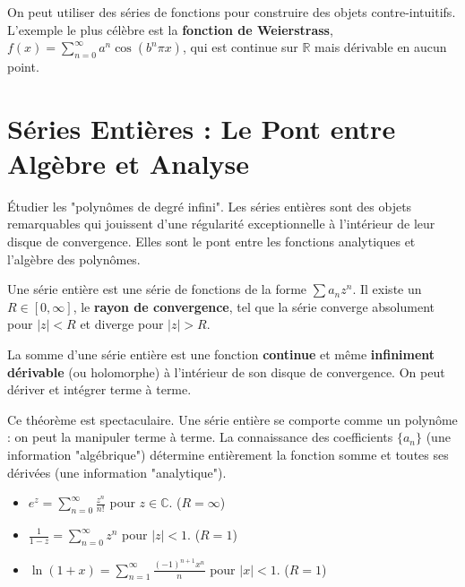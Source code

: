\begin{example}
    On peut utiliser des séries de fonctions pour construire des objets contre-intuitifs. L'exemple le plus célèbre est la \textbf{fonction de Weierstrass}, $f(x) = \sum_{n=0}^\infty a^n \cos(b^n \pi x)$, qui est continue sur $\mathbb{R}$ mais dérivable en aucun point.
\end{example}

\section{Séries Entières : Le Pont entre Algèbre et Analyse}

\begin{objectif}
    Étudier les "polynômes de degré infini". Les séries entières sont des objets remarquables qui jouissent d'une régularité exceptionnelle à l'intérieur de leur disque de convergence. Elles sont le pont entre les fonctions analytiques et l'algèbre des polynômes.
\end{objectif}

\begin{definition}
    Une série entière est une série de fonctions de la forme $\sum a_n z^n$. Il existe un $R \in [0, \infty]$, le \textbf{rayon de convergence}, tel que la série converge absolument pour $|z|<R$ et diverge pour $|z|>R$.
\end{definition}

\begin{theorem}
    La somme d'une série entière est une fonction \textbf{continue} et même \textbf{infiniment dérivable} (ou holomorphe) à l'intérieur de son disque de convergence. On peut dériver et intégrer terme à terme.
\end{theorem}

\begin{remark}
    Ce théorème est spectaculaire. Une série entière se comporte comme un polynôme : on peut la manipuler terme à terme. La connaissance des coefficients $\{a_n\}$ (une information "algébrique") détermine entièrement la fonction somme et toutes ses dérivées (une information "analytique").
\end{remark}

\begin{example}
    \begin{itemize}
        \item $e^z = \sum_{n=0}^\infty \frac{z^n}{n!}$ pour $z \in \mathbb{C}$. ($R=\infty$)
        \item $\frac{1}{1-z} = \sum_{n=0}^\infty z^n$ pour $|z|<1$. ($R=1$)
        \item $\ln(1+x) = \sum_{n=1}^\infty \frac{(-1)^{n+1}x^n}{n}$ pour $|x|<1$. ($R=1$)
    \end{itemize}
\end{example}

